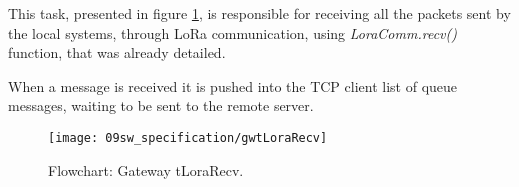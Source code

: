 
This task, presented in figure \ref{fig:gwtLoraRecv}, is responsible for receiving all the packets sent by the local systems, through LoRa communication, using \textit{LoraComm.recv()} function, that was already detailed.

When a message is received it is pushed into the TCP client list of queue messages, waiting to be sent to the remote server.

\begin{figure}[H]
	\centering
	\texttt{[image: 09sw\_specification/gwtLoraRecv]}
	\caption{Flowchart: Gateway tLoraRecv.}
	\label{fig:gwtLoraRecv}
\end{figure}

%
%


